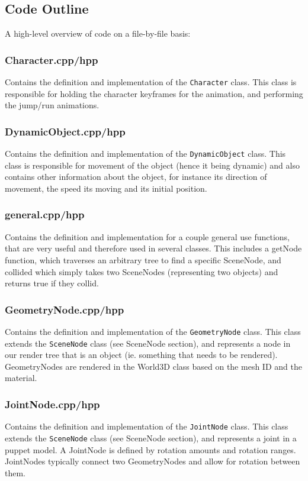 \documentclass {article}
\begin{document}
\subsection{Code Outline}
A high-level overview of code on a file-by-file basis:

\subsubsection{Character.cpp/hpp}
Contains the definition and implementation of the \texttt{Character} class. This class is responsible for holding the character keyframes for the animation, and performing the jump/run animations.

\subsubsection{DynamicObject.cpp/hpp}
Contains the definition and implementation of the \texttt{DynamicObject} class. This class is responsible for movement of the object (hence it being dynamic) and also contains other information about the object, for instance its direction of movement, the speed its moving and its initial position.

\subsubsection{general.cpp/hpp}
Contains the definition and implementation for a couple general use functions, that are very useful and therefore used in several classes. This includes a getNode function, which traverses an arbitrary tree to find a specific SceneNode, and collided which simply takes two SceneNodes (representing two objects) and returns true if they collid.

\subsubsection{GeometryNode.cpp/hpp}
Contains the definition and implementation of the \texttt{GeometryNode} class. This class extends the \texttt{SceneNode} class (see SceneNode section), and represents a node in our render tree that is an object (ie. something that needs to be rendered). GeometryNodes are rendered in the World3D class based on the mesh ID and the material.

\subsubsection{JointNode.cpp/hpp}
Contains the definition and implementation of the \texttt{JointNode} class. This class extends the \texttt{SceneNode} class (see SceneNode section), and represents a joint in a puppet model. A JointNode is defined by rotation amounts and rotation ranges. JointNodes typically connect two GeometryNodes and allow for rotation between them.
\end{document}
